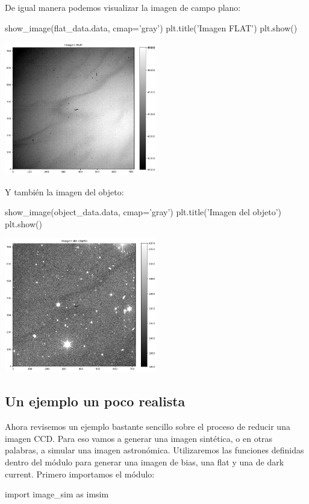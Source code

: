 De igual manera podemos visualizar la imagen de campo plano:
\begin{pyin}
show_image(flat_data.data, cmap='gray')
plt.title('Imagen FLAT')
plt.show()
\end{pyin}

\noindent
\includegraphics[width=0.5\textwidth]{figures/binary_flat_example.png}

Y también la imagen del objeto:
\begin{pyin}
show_image(object_data.data, cmap='gray')
plt.title('Imagen del objeto')
plt.show()
\end{pyin}

\noindent
\includegraphics[width=0.5\textwidth]{figures/binary_object_example.png}

\subsection{Un ejemplo un poco realista}
Ahora revisemos un ejemplo bastante sencillo sobre el proceso de reducir una imagen CCD. Para eso vamos a generar una imagen sintética, o en otras palabras, a simular una imagen astronómica. Utilizaremos las funciones definidas dentro del módulo  para generar una imagen de bias, una flat y una de dark current. Primero importamos el módulo:

\begin{pyin}
import image_sim as imsim
\end{pyin}

